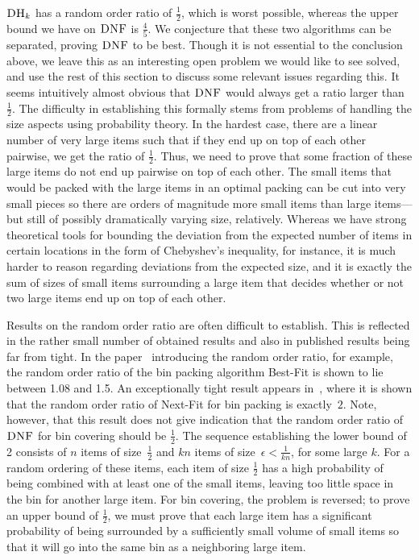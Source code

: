 \documentclass[11pt]{article}
\newcommand{\DNF}{\ensuremath{\operatorname{\textsc{DNF}}}\xspace}
\newcommand{\DHk}{{\ensuremath{\textsc{DH}_k}}\xspace}
\begin{document}
\DHk has a random order ratio of $\frac{1}{2}$,
which is worst possible, whereas the upper bound we have on
\DNF is $\frac{4}{5}$. We conjecture that these two algorithms
can be separated, proving \DNF to be best.
Though it is not essential to the conclusion above,
we leave this as an interesting open problem we would like to see solved,
and use the rest of this section to discuss some relevant issues
regarding this.
It seems intuitively almost obvious that
\DNF would always get a ratio larger than $\frac{1}{2}$.
The difficulty in establishing this formally stems from problems of
handling the size aspects using probability theory. In the hardest
case, there are a linear number of very large items such that if
they end up on top of each other pairwise, we get the ratio of $\frac{1}{2}$. 
Thus, we need to prove that some fraction of these large items do not end up pairwise
on top of each other.
The small items that would be packed with the large items in an
optimal packing can be cut into very small pieces so there are
orders of magnitude more small items than large items---but still of
possibly dramatically varying size, relatively.
Whereas we have strong theoretical tools for
bounding the deviation from the expected
number of items in certain locations in the form of
Chebyshev's inequality, for instance, it is much harder to reason
regarding deviations from the expected size, and it is exactly the sum
of sizes of small items surrounding a large item that decides whether or not
two large items end up on top of each other.

Results on the random order ratio are often difficult to establish.
This is reflected in the rather small
number of obtained results and also in published
results being far from tight. In the paper~\cite{K96}
introducing the random order ratio, for example,
the random order ratio of the bin
packing algorithm Best-Fit is shown to lie between 1.08 and 1.5.
An exceptionally tight result appears in~\cite{CCRZ08}, where it is shown
that the random order ratio of Next-Fit for bin packing is exactly~$2$.
Note, however, that this result does not give indication that the
random order ratio of \DNF for bin covering should be
$\frac{1}{2}$. The sequence establishing the lower bound of 2 consists of
$n$ items of size~$\frac{1}{2}$ and $kn$ items of size~$\epsilon <
\frac{1}{kn}$, for some large $k$. For a random ordering of these
items, each item of size $\frac{1}{2}$ has a high probability of
being combined with at least one of the small items, leaving too
little space in the bin for another large item. 
For bin covering, the problem is reversed;
to prove an upper bound of $\frac12$,
we must prove that each large item has a
significant probability of being surrounded by a sufficiently small
volume of small items so that it will go into the same bin as a
neighboring large item.




\end{document}
